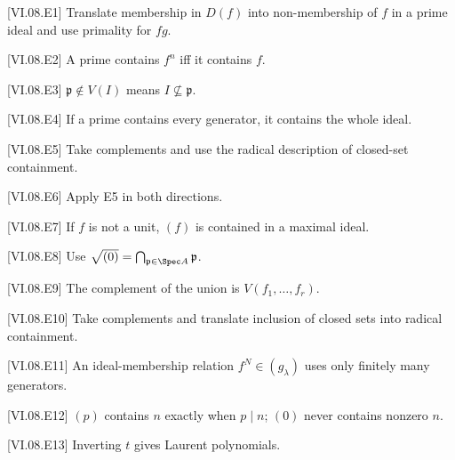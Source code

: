 \begin{hint}
[VI.08.E1]
Translate membership in $D(f)$ into non-membership of $f$ in a prime ideal and use primality for $fg$.
\end{hint}
\begin{hint}
[VI.08.E2]
A prime contains $f^n$ iff it contains $f$.
\end{hint}
\begin{hint}
[VI.08.E3]
$\mathfrak p\notin V(I)$ means $I\not\subseteq\mathfrak p$.
\end{hint}
\begin{hint}
[VI.08.E4]
If a prime contains every generator, it contains the whole ideal.
\end{hint}
\begin{hint}
[VI.08.E5]
Take complements and use the radical description of closed-set containment.
\end{hint}
\begin{hint}
[VI.08.E6]
Apply E5 in both directions.
\end{hint}
\begin{hint}
[VI.08.E7]
If $f$ is not a unit, $(f)$ is contained in a maximal ideal.
\end{hint}
\begin{hint}
[VI.08.E8]
Use $\sqrt{(0)}=\bigcap_{\mathfrak p\in\Spec A}\mathfrak p$.
\end{hint}
\begin{hint}
[VI.08.E9]
The complement of the union is $V(f_1,\dots,f_r)$.
\end{hint}
\begin{hint}
[VI.08.E10]
Take complements and translate inclusion of closed sets into radical containment.
\end{hint}
\begin{hint}
[VI.08.E11]
An ideal-membership relation $f^N\in(g_\lambda)$ uses only finitely many generators.
\end{hint}
\begin{hint}
[VI.08.E12]
$(p)$ contains $n$ exactly when $p\mid n$; $(0)$ never contains nonzero $n$.
\end{hint}
\begin{hint}
[VI.08.E13]
Inverting $t$ gives Laurent polynomials.
\end{hint}
